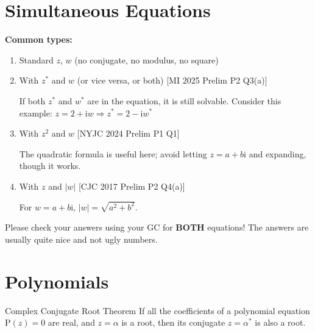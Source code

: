 \section{Simultaneous Equations}
\textbf{Common types:}
\begin{enumerate}
\item Standard $z$, $w$ (no conjugate, no modulus, no square)
\item With $z^{*}$ and $w$ (or vice versa, or both)
\hfill{\small[MI 2025 Prelim P2 Q3(a)]}\par
{\color{gray}If both $z^{*}$ and $w^{*}$ are in the equation, it is still solvable. Consider this example: $z=2+\mathrm{i}w\Rightarrow z^{*}=2-\mathrm{i}w^{*}$}
\item With $z^{2}$ and $w$
\hfill{\small[NYJC 2024 Prelim P1 Q1]}\par
{\color{gray}The quadratic formula is useful here; avoid letting $z=a+b\mathrm{i}$ and expanding, though it works.}
\item With $z$ and $|w|$
\hfill{\small[CJC 2017 Prelim P2 Q4(a)]}\par
{\color{gray}For $w=a+b\mathrm{i}$, $\left|w\right|=\sqrt{a^{2}+b^{2}}$.}
\end{enumerate}
\begin{info}[title=Note]
Please check your answers using your GC for \textbf{BOTH} equations! The answers are usually quite nice and not ugly numbers.
\end{info}
\clearpage
\section{Polynomials}
\begin{theorem}{Complex Conjugate Root Theorem}
If all the coefficients of a polynomial equation $\mathrm{P}(z)=0$ are real, and $z=\alpha$ is a root, then its conjugate $z=\alpha^{*}$ is also a root.
\end{theorem}

